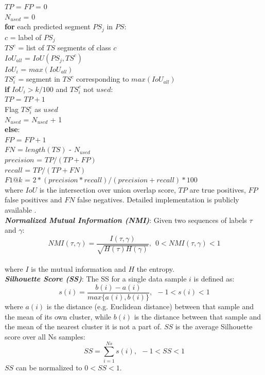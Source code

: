 \documentclass[journal]{IEEEtran}
\begin{document}
\noindent \indent $TP$ = $FP$ = $0$\\
\indent $N_{used}$ = $0$\\
\indent \textbf{for} each predicted segment $PS_j$ in $PS$:\\
\indent \indent $c$ = label of $PS_j$\\
\indent \indent $TS^c$ = list of $TS$ segments of class $c$\\
\indent \indent $IoU_{all}$ = $IoU(PS_j, TS^c)$\\
\indent \indent $IoU_i$ = $max(IoU_{all})$\\
\indent \indent $TS^c_i$ = segment in $TS^c$ corresponding to $max(IoU_{all})$\\
\indent \indent \textbf{if} $IoU_i > k/100$ and $TS^c_i$ not $used$:\\
\indent \indent \indent $TP$ = $TP + 1$\\
\indent \indent \indent Flag $TS^c_i$ as $used$ \\
\indent \indent \indent $N_{used}$ = $N_{used}$ + 1 \\
\indent \indent \textbf{else}:\\
\indent \indent \indent $FP$ = $FP + 1$\\
\indent $FN$ = $length(TS)$ - $N_{used}$ \\
\indent $precision$ = $TP / (TP+FP)$\\
\indent $recall$ = $TP / (TP+FN)$\\
\indent $F1@k$ = $2 * (precision*recall) / (precision+recall) * 100$\\

\noindent where $IoU$ is the intersection over union overlap score, $TP$ are true positives, $FP$ false positives and $FN$ false negatives. Detailed implementation is publicly available \cite{LeaTcnCode}.\\

\noindent \textbf{\textit{Normalized Mutual Information (NMI)}}: Given two sequences of labels $\tau$ and $\gamma$:
$$NMI(\tau,\gamma)=\frac{I(\tau,\gamma)}{\sqrt{H(\tau)H(\gamma)}}, \ \ 0 < NMI(\tau,\gamma) < 1 $$\\
\noindent where $I$ is the mutual information and $H$ the entropy.\\

\noindent \textbf{\textit{Silhouette Score (SS)}}: The SS for a single data sample $i$ is defined as:
$$ s(i)=\frac{b(i)-a(i)}{max\{a(i),b(i)\}}, \ \ -1 < s(i) < 1 $$
\noindent where $a(i)$ is the distance (e.g. Euclidean distance) between that sample and the mean of its own cluster, while $b(i)$ is the distance between that sample and the mean of the nearest cluster it is not a part of. 
$SS$ is the average Silhouette score over all Ns samples:
$$ SS=\sum_{i=1}^{Ns}{s(i)}, \ \ -1 < SS < 1 $$
\noindent $SS$ can be normalized to $0 < SS < 1$.


\end{document}

